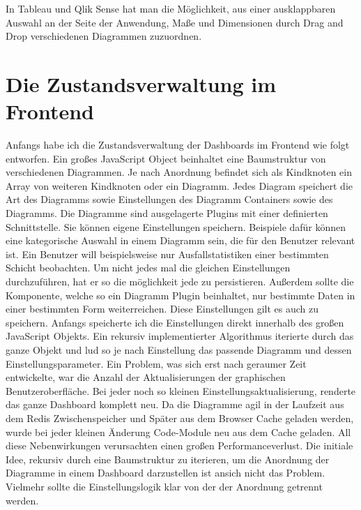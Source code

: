 


In Tableau und Qlik Sense hat man die Möglichkeit, aus einer ausklappbaren Auswahl an der Seite der
Anwendung, Maße und Dimensionen durch Drag and Drop verschiedenen Diagrammen zuzuordnen. 

\section{Die Zustandsverwaltung im Frontend}
Anfangs habe ich die Zustandsverwaltung der Dashboards im Frontend wie
folgt entworfen. Ein großes JavaScript Object beinhaltet eine Baumstruktur
von verschiedenen Diagrammen. Je nach Anordnung befindet sich als Kindknoten
ein Array von weiteren Kindknoten oder ein Diagramm. Jedes Diagram speichert
die Art des Diagramms sowie Einstellungen des Diagramm Containers sowie des
Diagramms. Die Diagramme sind ausgelagerte Plugins mit einer definierten
Schnittstelle. Sie können eigene Einstellungen speichern. Beispiele dafür
können eine kategorische Auswahl in einem Diagramm sein, die für den Benutzer
relevant ist. Ein Benutzer will beispielsweise nur Ausfallstatistiken einer
bestimmten Schicht beobachten. Um nicht jedes mal die gleichen Einstellungen
durchzuführen, hat er so die möglichkeit jede zu persistieren. Außerdem sollte
die Komponente, welche so ein Diagramm Plugin beinhaltet, nur bestimmte Daten
in einer bestimmten Form weiterreichen. Diese Einstellungen gilt es auch zu speichern.
Anfangs speicherte ich die Einstellungen direkt innerhalb des großen JavaScript Objekts.
Ein rekursiv implementierter Algorithmus iterierte durch das ganze Objekt und lud so 
je nach Einstellung das passende Diagramm und dessen Einstellungsparameter. Ein Problem,
was sich erst nach geraumer Zeit entwickelte, war die Anzahl der Aktualisierungen
der graphischen Benutzeroberfläche. Bei jeder noch so kleinen Einstellungsaktualisierung,
renderte das ganze Dashboard komplett neu. Da die Diagramme agil in der Laufzeit aus dem
Redis Zwischenspeicher und Später aus dem Browser Cache geladen werden, wurde bei jeder
kleinen Änderung Code-Module neu aus dem Cache geladen. All diese Nebenwirkungen
verursachten einen großen Performanceverlust. Die initiale Idee, rekursiv durch
eine Baumstruktur zu iterieren, um die Anordnung der Diagramme in einem Dashboard
darzustellen ist ansich nicht das Problem. Vielmehr sollte die Einstellungslogik klar
von der der Anordnung getrennt werden.  

